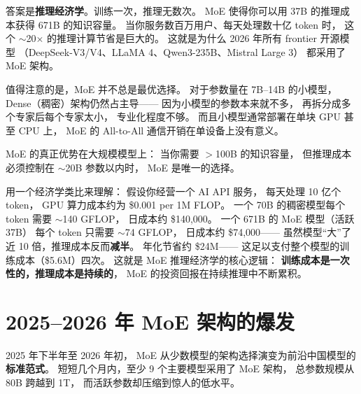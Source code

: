 \begin{whybox}
答案是\textbf{推理经济学}。训练一次，推理无数次。
MoE 使得你可以用 37B 的推理成本获得 671B 的知识容量。
当你服务数百万用户、每天处理数十亿 token 时，
这个 $\sim$20$\times$ 的推理计算节省是巨大的。
这就是为什么 2026 年所有 frontier 开源模型
（DeepSeek-V3/V4、LLaMA 4、Qwen3-235B、Mistral Large 3）
都采用了 MoE 架构。

值得注意的是，MoE 并不总是最优选择。
对于参数量在 7B--14B 的小模型，
Dense（稠密）架构仍然占主导——
因为小模型的参数本来就不多，
再拆分成多个专家后每个专家太小，
专业化程度不够。
而且小模型通常部署在单块 GPU 甚至 CPU 上，
MoE 的 All-to-All 通信开销在单设备上没有意义。

MoE 的真正优势在大规模模型上：
当你需要 $>$100B 的知识容量，
但推理成本必须控制在 $\sim$20B 参数以内时，
MoE 是唯一的选择。

用一个经济学类比来理解：
假设你经营一个 AI API 服务，
每天处理 10 亿个 token，
GPU 算力成本约为 \$0.001 per 1M FLOP。
一个 70B 的稠密模型每个 token 需要 $\sim$140 GFLOP，
日成本约 \$140,000。
一个 671B 的 MoE 模型（活跃 37B）
每个 token 只需要 $\sim$74 GFLOP，
日成本约 \$74,000——
虽然模型“大”了近 10 倍，推理成本反而\textbf{减半}。
年化节省约 \$24M——
这足以支付整个模型的训练成本（\$5.6M）四次。
这就是 MoE 推理经济学的核心逻辑：
\textbf{训练成本是一次性的，推理成本是持续的}，
MoE 的投资回报在持续推理中不断累积。
\end{whybox}

\section{2025--2026 年 MoE 架构的爆发}
\label{sec:moe-explosion}

2025 年下半年至 2026 年初，
MoE 从少数模型的架构选择演变为前沿中国模型的\textbf{标准范式}。
短短几个月内，至少 9 个主要模型采用了 MoE 架构，
总参数规模从 80B 跨越到 1T，
而活跃参数却压缩到惊人的低水平。

